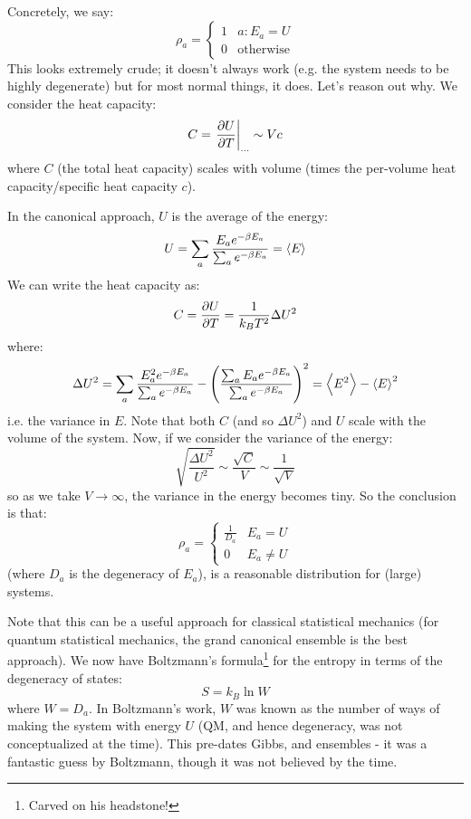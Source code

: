 Concretely, we say:
\begin{equation}
    \rho_a = \begin{cases}
        1 & a: E_a = U
        \\ 0 & \text{otherwise}
    \end{cases}
\end{equation}
This looks extremely crude; it doesn't always work (e.g. the system needs to be highly degenerate) but for most normal things, it does. Let's reason out why. We consider the heat capacity:
\begin{equation}
    C = \left.\frac{\partial U}{\partial T}\right|_{\ldots} \sim V c
\end{equation}
where $C$ (the total heat capacity) scales with volume (times the per-volume heat capacity/specific heat capacity $c$).

In the canonical approach, $U$ is the average of the energy:
\begin{equation}
    U = \sum_a\frac{ E_a e^{-\beta E_a}}{\sum_a e^{-\beta E_a}} = \left< E \right>
\end{equation}
We can write the heat capacity as:
\begin{equation}
    C = \frac{\partial U}{\partial T} = \frac{1}{k_B T^2}\Delta U^2
\end{equation}
where:
\begin{equation}
    \Delta U^2 = \sum_a \frac{E_a^2e^{-\beta E_a}}{\sum_a e^{-\beta E_a}} - \left(\frac{\sum_a E_a e^{-\beta E_a}}{\sum_a e^{-\beta E_a}}\right)^2 = \left< E^2 \right> - \left< E \right>^2
\end{equation}
i.e. the variance in $E$. Note that both $C$ (and so $\Delta U^2$) and $U$ scale with the volume of the system. Now, if we consider the variance of the energy:
\begin{equation}
    \sqrt{\frac{\Delta U^2}{U^2}} \sim \frac{\sqrt{C}}{V} \sim \frac{1}{\sqrt{V}}
\end{equation}
so as we take $V \to \infty$, the variance in the energy becomes tiny. So the conclusion is that:
\begin{equation}
    \rho_a = \begin{cases}
        \frac{1}{D_a} & E_a = U
        \\ 0 & E_a \neq U
    \end{cases}
\end{equation}
(where $D_a$ is the degeneracy of $E_a$), is a reasonable distribution for (large) systems. 

Note that this can be a useful approach for classical statistical mechanics (for quantum statistical mechanics, the grand canonical ensemble is the best approach). We now have Boltzmann's formula\footnote{Carved on his headstone!} for the entropy in terms of the degeneracy of states:
\begin{equation}
    S = k_B \ln W
\end{equation}
where $W = D_a$. In Boltzmann's work, $W$ was known as the number of ways of making the system with energy $U$ (QM, and hence degeneracy, was not conceptualized at the time). This pre-dates Gibbs, and ensembles - it was a fantastic guess by Boltzmann, though it was not believed by the time.

